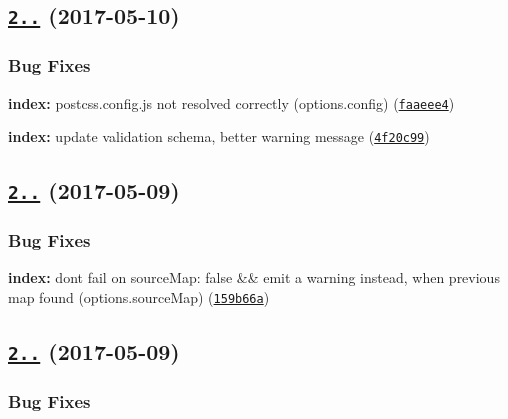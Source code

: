 \label{_2.0.4}%
 \subsection*{\href{https://github.com/postcss/postcss-loader/compare/v2.0.3...v2.0.4}{\tt 2..} (2017-\/05-\/10)}

\subsubsection*{Bug Fixes}


\begin{DoxyItemize}
\item {\bfseries index\+:} {\ttfamily postcss.\+config.\+js} not resolved correctly ({\ttfamily options.\+config}) (\href{https://github.com/postcss/postcss-loader/commit/faaeee4}{\tt faaeee4})
\item {\bfseries index\+:} update validation schema, better warning message (\href{https://github.com/postcss/postcss-loader/commit/4f20c99}{\tt 4f20c99})
\end{DoxyItemize}

\label{_2.0.3}%
 \subsection*{\href{https://github.com/postcss/postcss-loader/compare/v2.0.2...v2.0.3}{\tt 2..} (2017-\/05-\/09)}

\subsubsection*{Bug Fixes}


\begin{DoxyItemize}
\item {\bfseries index\+:} don\textquotesingle{}t fail on \textquotesingle{}source\+Map\+: false\textquotesingle{} \&\& emit a warning instead, when previous map found ({\ttfamily options.\+source\+Map}) (\href{https://github.com/postcss/postcss-loader/commit/159b66a}{\tt 159b66a})
\end{DoxyItemize}

\label{_2.0.2}%
 \subsection*{\href{https://github.com/postcss/postcss-loader/compare/v2.0.1...v2.0.2}{\tt 2..} (2017-\/05-\/09)}

\subsubsection*{Bug Fixes}


